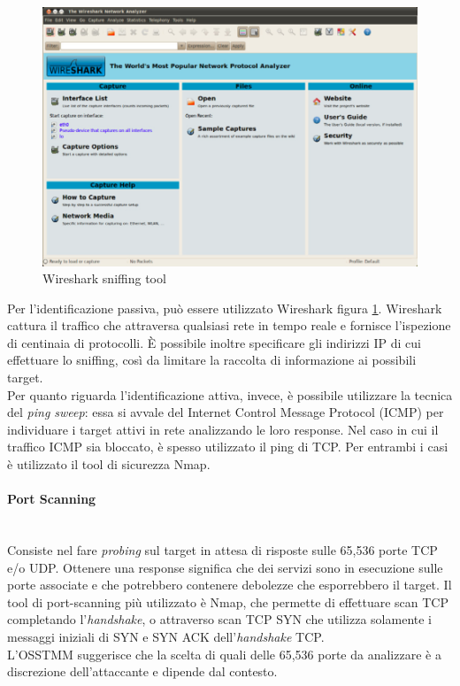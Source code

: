 \begin{figure}[hbtp]
	\centering
	\includegraphics[scale=.3]{imgs/attack/wireshark.png}
	\caption{Wireshark sniffing tool}
	\label{wireshark_img}
\end{figure}

Per l'identificazione passiva, può essere utilizzato Wireshark figura \ref{wireshark_img}.\cite{wireshark} Wireshark cattura il traffico che attraversa qualsiasi rete in tempo reale e fornisce l'ispezione di centinaia di protocolli. È possibile inoltre specificare gli indirizzi IP di cui effettuare lo sniffing, così da limitare la raccolta di informazione ai possibili target.\\
Per quanto riguarda l'identificazione attiva, invece, è possibile utilizzare la tecnica del \emph{ping sweep}: essa si avvale del Internet Control Message Protocol (ICMP) per individuare i target attivi in rete analizzando le loro response. Nel caso in cui il traffico ICMP sia bloccato, è spesso utilizzato il ping di TCP. Per entrambi i casi è utilizzato il tool di sicurezza Nmap.\cite{nmap}

\paragraph{Port Scanning}\mbox{}\\
Consiste nel fare \emph{probing} sul target in attesa di risposte sulle 65,536 porte TCP e/o UDP. Ottenere una response significa che dei servizi sono in esecuzione sulle porte associate e che potrebbero contenere debolezze che esporrebbero il target. Il tool di port-scanning più utilizzato è Nmap, che permette di effettuare scan TCP completando l'\emph{handshake}, o attraverso scan TCP SYN che utilizza solamente i messaggi iniziali di SYN e SYN ACK dell'\emph{handshake} TCP.\\
L'OSSTMM suggerisce che la scelta di quali delle 65,536 porte da analizzare è a discrezione dell'attaccante e dipende dal contesto.

